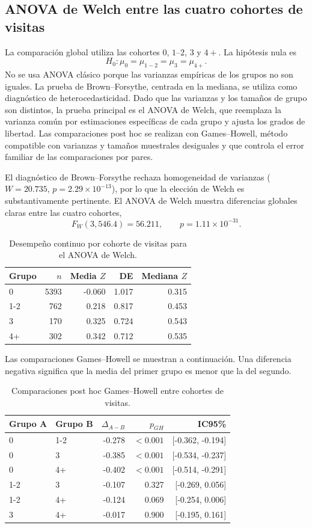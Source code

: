 \subsection{ANOVA de Welch entre las cuatro cohortes de visitas}

La comparación global utiliza las cohortes $0$, $1$--$2$, $3$ y $4+$. La hipótesis nula es
\[
H_0:\mu_0=\mu_{1-2}=\mu_3=\mu_{4+}.
\]
No se usa ANOVA clásico porque las varianzas empíricas de los grupos no son iguales. La prueba de Brown--Forsythe, centrada en la mediana, se utiliza como diagnóstico de heterocedasticidad. Dado que las varianzas y los tamaños de grupo son distintos, la prueba principal es el ANOVA de Welch, que reemplaza la varianza común por estimaciones específicas de cada grupo y ajusta los grados de libertad. Las comparaciones post hoc se realizan con Games--Howell, método compatible con varianzas y tamaños muestrales desiguales y que controla el error familiar de las comparaciones por pares.

El diagnóstico de Brown--Forsythe rechaza homogeneidad de varianzas ($W=20.735$, $p=2.29\times10^{-13}$), por lo que la elección de Welch es substantivamente pertinente. El ANOVA de Welch muestra diferencias globales claras entre las cuatro cohortes,
\[
F_W(3,546.4)=56.211,\qquad p=1.11\times10^{-31}.
\]

\begin{table}[H]
\centering
\caption{Desempeño continuo por cohorte de visitas para el ANOVA de Welch.}
\begin{tabular}{lrrrr}
\toprule
Grupo & $n$ & Media $Z$ & DE & Mediana $Z$ \\
\midrule
0 & 5393 & -0.060 & 1.017 & 0.315 \\
1-2 & 762 & 0.218 & 0.817 & 0.453 \\
3 & 170 & 0.325 & 0.724 & 0.543 \\
4+ & 302 & 0.342 & 0.712 & 0.535 \\
\bottomrule
\end{tabular}
\end{table}

Las comparaciones Games--Howell se muestran a continuación. Una diferencia negativa significa que la media del primer grupo es menor que la del segundo.

\begin{table}[H]
\centering
\caption{Comparaciones post hoc Games--Howell entre cohortes de visitas.}
\begin{tabular}{llrrr}
\toprule
Grupo A & Grupo B & $\Delta_{A-B}$ & $p_{GH}$ & IC95\% \\
\midrule
0 & 1-2 & -0.278 & $<0.001$ & [-0.362, -0.194] \\
0 & 3 & -0.385 & $<0.001$ & [-0.534, -0.237] \\
0 & 4+ & -0.402 & $<0.001$ & [-0.514, -0.291] \\
1-2 & 3 & -0.107 & 0.327 & [-0.269, 0.056] \\
1-2 & 4+ & -0.124 & 0.069 & [-0.254, 0.006] \\
3 & 4+ & -0.017 & 0.900 & [-0.195, 0.161] \\
\bottomrule
\end{tabular}
\end{table}

